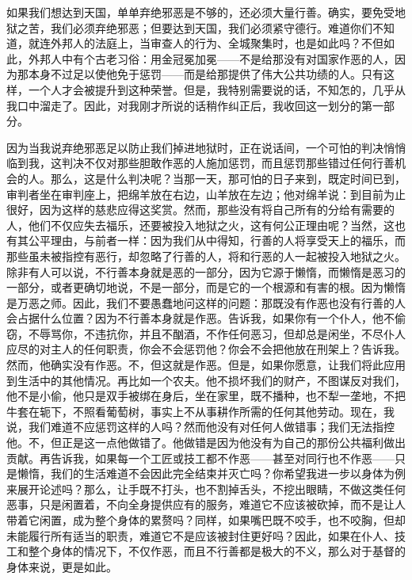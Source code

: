 如果我们想达到天国，单单弃绝邪恶是不够的，还必须大量行善。确实，要免受地狱之苦，我们必须弃绝邪恶；但要达到天国，我们必须紧守德行。难道你们不知道，就连外邦人的法庭上，当审查人的行为、全城聚集时，也是如此吗？不但如此，外邦人中有个古老习俗：用金冠冕加冕——不是给那没有对国家作恶的人，因为那本身不过足以使他免于惩罚——而是给那提供了伟大公共功绩的人。只有这样，一个人才会被提升到这种荣誉。但是，我特别需要说的话，不知怎的，几乎从我口中溜走了。因此，对我刚才所说的话稍作纠正后，我收回这一划分的第一部分。\par

因为当我说弃绝邪恶足以防止我们掉进地狱时，正在说话间，一个可怕的判决悄悄临到我，这判决不仅对那些胆敢作恶的人施加惩罚，而且惩罚那些错过任何行善机会的人。那么，这是什么判决呢？当那一天，那可怕的日子来到，既定时间已到，审判者坐在审判座上，把绵羊放在右边，山羊放在左边；他对绵羊说：到目前为止很好，因为这样的慈悲应得这奖赏。然而，那些没有将自己所有的分给有需要的人，他们不仅应失去福乐，还要被投入地狱之火，这有何公正理由呢？当然，这也有其公平理由，与前者一样：因为我们从中得知，行善的人将享受天上的福乐，而那些虽未被指控有恶行，却忽略了行善的人，将和行恶的人一起被投入地狱之火。除非有人可以说，不行善本身就是恶的一部分，因为它源于懒惰，而懒惰是恶习的一部分，或者更确切地说，不是一部分，而是它的一个根源和有害的根。因为懒惰是万恶之师。因此，我们不要愚蠢地问这样的问题：那既没有作恶也没有行善的人会占据什么位置？因为不行善本身就是作恶。告诉我，如果你有一个仆人，他不偷窃，不辱骂你，不违抗你，并且不酗酒，不作任何恶习，但却总是闲坐，不尽仆人应尽的对主人的任何职责，你会不会惩罚他？你会不会把他放在刑架上？告诉我。然而，他确实没有作恶。不，但这就是作恶。但是，如果你愿意，让我们将此应用到生活中的其他情况。再比如一个农夫。他不损坏我们的财产，不图谋反对我们，他不是小偷，他只是双手被绑在身后，坐在家里，既不播种，也不犁一垄地，不把牛套在轭下，不照看葡萄树，事实上不从事耕作所需的任何其他劳动。现在，我说，我们难道不应惩罚这样的人吗？然而他没有对任何人做错事；我们无法指控他。不，但正是这一点他做错了。他做错是因为他没有为自己的那份公共福利做出贡献。再告诉我，如果每一个工匠或技工都不作恶——甚至对同行也不作恶——只是懒惰，我们的生活难道不会因此完全结束并灭亡吗？你希望我进一步以身体为例来展开论述吗？那么，让手既不打头，也不割掉舌头，不挖出眼睛，不做这类任何恶事，只是闲置着，不向全身提供应有的服务，难道它不应该被砍掉，而不是让人带着它闲置，成为整个身体的累赘吗？同样，如果嘴巴既不咬手，也不咬胸，但却未能履行所有适当的职责，难道它不是应该被封住更好吗？因此，如果在仆人、技工和整个身体的情况下，不仅作恶，而且不行善都是极大的不义，那么对于基督的身体来说，更是如此。\par

